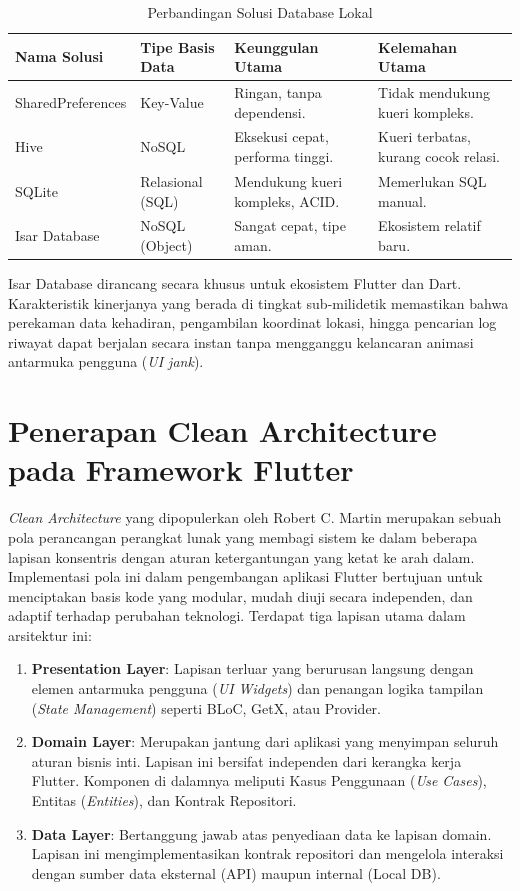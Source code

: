 \begin{table}[ht]
\centering
\caption{Perbandingan Solusi Database Lokal}
\label{tab:perbandingan_db}
\begin{tabular}{|l|l|p{3.5cm}|p{3.5cm}|}
\hline
\textbf{Nama Solusi} & \textbf{Tipe Basis Data} & \textbf{Keunggulan Utama} & \textbf{Kelemahan Utama} \\ \hline
SharedPreferences & Key-Value & Ringan, tanpa dependensi. & Tidak mendukung kueri kompleks. \\ \hline
Hive & NoSQL & Eksekusi cepat, performa tinggi. & Kueri terbatas, kurang cocok relasi. \\ \hline
SQLite & Relasional (SQL) & Mendukung kueri kompleks, ACID. & Memerlukan SQL manual. \\ \hline
Isar Database & NoSQL (Object) & Sangat cepat, tipe aman. & Ekosistem relatif baru. \\ \hline
\end{tabular}
\end{table}

Isar Database dirancang secara khusus untuk ekosistem Flutter dan Dart. Karakteristik kinerjanya yang berada di tingkat sub-milidetik memastikan bahwa perekaman data kehadiran, pengambilan koordinat lokasi, hingga pencarian log riwayat dapat berjalan secara instan tanpa mengganggu kelancaran animasi antarmuka pengguna (\textit{UI jank}).

\section{Penerapan Clean Architecture pada Framework Flutter}
\textit{Clean Architecture} yang dipopulerkan oleh Robert C. Martin merupakan sebuah pola perancangan perangkat lunak yang membagi sistem ke dalam beberapa lapisan konsentris dengan aturan ketergantungan yang ketat ke arah dalam. Implementasi pola ini dalam pengembangan aplikasi Flutter bertujuan untuk menciptakan basis kode yang modular, mudah diuji secara independen, dan adaptif terhadap perubahan teknologi. Terdapat tiga lapisan utama dalam arsitektur ini:
\begin{enumerate}
    \item \textbf{Presentation Layer}: Lapisan terluar yang berurusan langsung dengan elemen antarmuka pengguna (\textit{UI Widgets}) dan penangan logika tampilan (\textit{State Management}) seperti BLoC, GetX, atau Provider.
    \item \textbf{Domain Layer}: Merupakan jantung dari aplikasi yang menyimpan seluruh aturan bisnis inti. Lapisan ini bersifat independen dari kerangka kerja Flutter. Komponen di dalamnya meliputi Kasus Penggunaan (\textit{Use Cases}), Entitas (\textit{Entities}), dan Kontrak Repositori.
    \item \textbf{Data Layer}: Bertanggung jawab atas penyediaan data ke lapisan domain. Lapisan ini mengimplementasikan kontrak repositori dan mengelola interaksi dengan sumber data eksternal (API) maupun internal (Local DB).
\end{enumerate}

